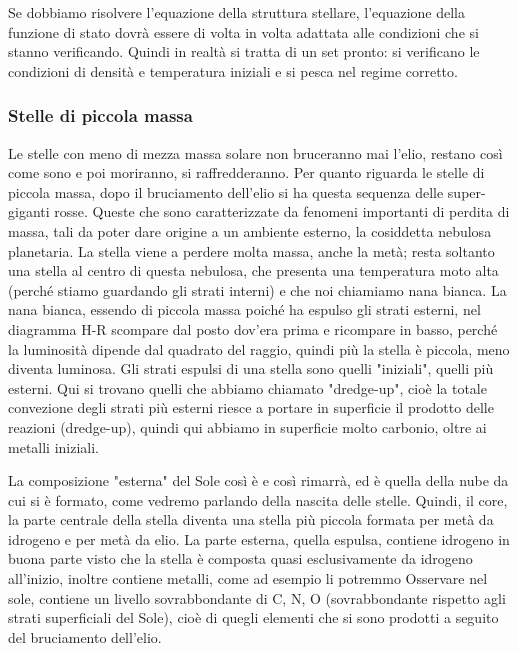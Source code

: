 Se dobbiamo risolvere l'equazione della struttura stellare, l'equazione della funzione di stato dovrà essere di volta in volta adattata alle condizioni che si stanno verificando. Quindi in realtà si tratta di un set pronto: si verificano le condizioni di densità e temperatura iniziali e si pesca nel regime corretto.

\subsubsection{Stelle di piccola massa}
Le stelle con meno di mezza massa solare non bruceranno mai l'elio, restano così come sono e poi moriranno, si raffredderanno. Per quanto riguarda le stelle di piccola massa, dopo il bruciamento dell'elio si ha questa sequenza delle super-giganti rosse. Queste che sono caratterizzate da fenomeni importanti di perdita di massa, tali da poter dare origine a un ambiente esterno, la cosiddetta nebulosa planetaria. La stella viene a perdere molta massa, anche la metà; resta soltanto una stella al centro di questa nebulosa, che presenta una temperatura moto alta (perché stiamo guardando gli strati interni) e che noi chiamiamo nana bianca. La nana bianca, essendo di piccola massa poiché ha espulso gli strati esterni, nel diagramma H-R scompare dal posto dov'era prima e ricompare in basso, perché la luminosità dipende dal quadrato del raggio, quindi più la stella è piccola, meno diventa luminosa. Gli strati espulsi di una stella sono quelli "iniziali", quelli più esterni. Qui si trovano quelli che abbiamo chiamato "dredge-up", cioè la totale convezione degli strati più esterni riesce a portare in superficie il prodotto delle reazioni (dredge-up), quindi qui abbiamo in superficie molto carbonio, oltre ai metalli iniziali.

La composizione "esterna" del Sole così è e così rimarrà, ed è quella della nube da cui si è formato, come vedremo parlando della nascita delle stelle. Quindi, il core, la parte centrale della stella diventa una stella più piccola formata per metà da idrogeno e per metà da elio. La parte esterna, quella espulsa, contiene idrogeno in buona parte visto che la stella è composta quasi esclusivamente da idrogeno all'inizio, inoltre contiene metalli, come ad esempio li potremmo Osservare nel sole, contiene un livello sovrabbondante di C, N, O (sovrabbondante rispetto agli strati superficiali del Sole), cioè di quegli elementi che si sono prodotti a seguito del bruciamento dell'elio.

